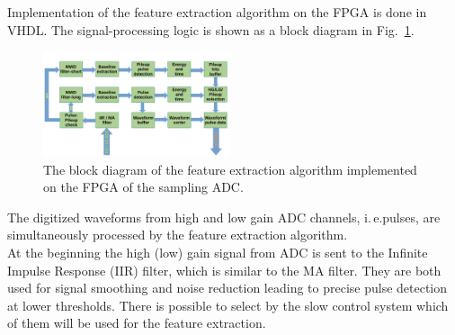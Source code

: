 \documentclass[12pt,a4paper, twocolumn]{article}
\newcommand{\Reffig}[1]{Fig.~\ref{#1}}
\begin{document}
Implementation of the feature extraction algorithm on the FPGA is done in VHDL. The signal-processing logic is shown as a block diagram in \Reffig{fig:fea_fwendcap}. 
\begin{figure}[h]
    \includegraphics[width=0.49\textwidth ,trim={0 0 0 0}, clip]{fig/Scheme_FE.pdf}
    \caption[Scheme of the Feature Extraction Algorithm implemented on ADC]{
    The block diagram of the feature extraction algorithm implemented on the FPGA of the sampling ADC.}
    \label{fig:fea_fwendcap}
\end{figure}
The digitized waveforms from high and low gain ADC channels, i.\,e.\@ pulses, are simultaneously processed by the feature extraction algorithm. \\At the beginning the high (low) gain signal from ADC is sent to the Infinite Impulse Response (IIR) filter, which is similar to the MA filter. They are both used for signal smoothing and noise reduction leading to precise pulse detection at lower thresholds. There is possible to select by the slow control system which of them will be used for the feature extraction.
\end{document}

